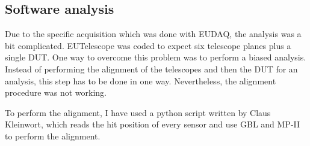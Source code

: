     \subsection{Software analysis}

    Due to the specific acquisition which was done with EUDAQ, the analysis was a bit complicated.
    EUTelescope was coded to expect six telescope planes plus a single DUT.
    One way to overcome this problem was to perform a biased analysis.
    Instead of performing the alignment of the telescopes and then the DUT for an analysis, this step has to be done in one way.
    Nevertheless, the alignment procedure was not working.

    To perform the alignment, I have used a python script written by Claus Kleinwort, which reads the hit position of every sensor and use GBL and MP-II to perform the alignment.

